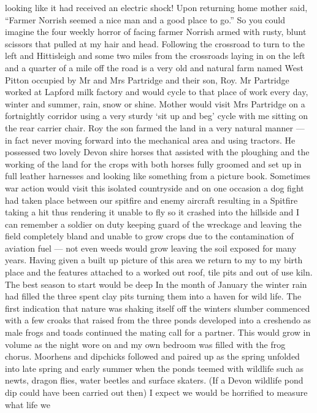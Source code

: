 looking like it had received an electric shock!  Upon returning home mother
said, ``Farmer Norrish seemed a nice man and a good place to go.''  So you
could imagine the four weekly horror of facing farmer Norrish armed with rusty,
blunt scissors that pulled at my hair and head. Following the crossroad to turn
to the left and Hittisleigh and some two miles from the crossroads laying in on
the left and a quarter of a mile off the road is a very old and natural farm
named West Pitton occupied by Mr and Mrs Partridge and their son, Roy. Mr
Partridge worked at Lapford milk factory and would cycle to that place of work
every day, winter and summer, rain, snow or shine. Mother would visit Mrs
Partridge on a fortnightly corridor using a very sturdy ‘sit up and beg' cycle
with me sitting on the rear carrier chair. Roy the son farmed the land in a
very natural manner — in fact never moving forward into the mechanical area and
using tractors. He possessed two lovely Devon shire horses that assisted with
the ploughing and the working of the land for the crops with both horses fully
groomed and set up in full leather harnesses and looking like something from a
picture book. Sometimes war action would visit this isolated countryside and on
one occasion a dog fight had taken place between our spitfire and enemy
aircraft resulting in a Spitfire taking a hit thus rendering it unable to fly
so it crashed into the hillside and I can remember a soldier on duty keeping
guard of the wreckage and leaving the field completely bland and unable to grow
crops due to the contamination of aviation fuel — not even weeds would grow
leaving the soil exposed for many years. Having given a built up picture of
this area we return to my to my birth place and the features attached to a
worked out roof, tile pits and out of use kiln. The best season to start would
be deep In the month of January the winter rain had filled the three spent clay
pits turning them into a haven for wild life. The first indication that nature
was shaking itself off the winters slumber commenced with a few croaks that
raised from the three ponds developed into a creshendo as male frogs and toads
continued the mating call for a partner. This would grow in volume as the night
wore on and my own bedroom was filled with the frog chorus. Moorhens and
dipchicks followed and paired up as the spring unfolded into late spring and
early summer when the ponds teemed with wildlife such as newts, dragon flies,
water beetles and surface skaters. (If a Devon wildlife pond dip could have
been carried out then) I expect we would be horrified to measure what life we
